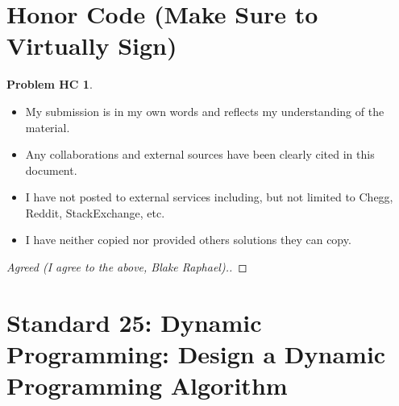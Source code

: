 \documentclass[11pt]{article}
\theoremstyle{definition}
\theoremstyle{definition}
\newtheorem*{requiredHC}{Problem HC}
\theoremstyle{definition}
\begin{document}
\newpage
\section*{Honor Code (Make Sure to Virtually Sign)} \label{HonorCode}
\hypertarget{HonorCode}{}

\begin{requiredHC}
\begin{itemize}
\item My submission is in my own words and reflects my understanding of the material.
\item Any collaborations and external sources have been clearly cited in this document.
\item I have not posted to external services including, but not limited to Chegg, Reddit, StackExchange, etc.
\item I have neither copied nor provided others solutions they can copy.
\end{itemize}

\end{requiredHC}

\begin{proof}[Agreed (I agree to the above, Blake Raphael).]
\end{proof}


\newpage
\setcounter{section}{24}
\section{Standard 25: Dynamic Programming: Design a Dynamic Programming Algorithm}
\end{document}
